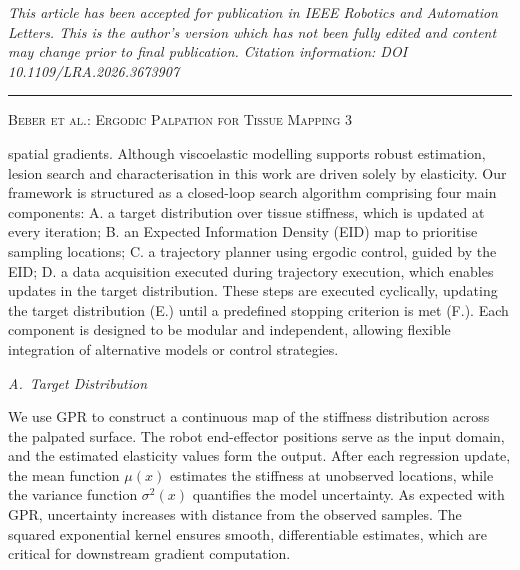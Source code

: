 \documentclass[11pt]{article}
\begin{document}
\begin{center}
{\footnotesize\itshape
This article has been accepted for publication in IEEE Robotics and
Automation Letters. This is the author's version which has not been
fully edited and content may change prior to final publication.
Citation information: DOI 10.1109/LRA.2026.3673907\par}
\end{center}

\vspace{0.4em}
\hrule
\vspace{0.6em}

\noindent
{\footnotesize\scshape Beber et al.: Ergodic Palpation for Tissue Mapping \hfill 3}

\vspace{1.2em}

\noindent
spatial gradients. Although viscoelastic modelling supports robust
estimation, lesion search and characterisation in this work are driven
solely by elasticity. Our framework is structured as a closed-loop
search algorithm comprising four main components: A. a target
distribution over tissue stiffness, which is updated at every
iteration; B. an Expected Information Density (EID) map to prioritise
sampling locations; C. a trajectory planner using ergodic control,
guided by the EID; D. a data acquisition executed during trajectory
execution, which enables updates in the target distribution. These
steps are executed cyclically, updating the target distribution (E.)
until a predefined stopping criterion is met (F.). Each component is
designed to be modular and independent, allowing flexible integration
of alternative models or control strategies.

\vspace{0.6em}

\noindent\textit{A.~Target Distribution}

\vspace{0.2em}

\noindent
We use GPR to construct a continuous map of the stiffness distribution
across the palpated surface. The robot end-effector positions serve as
the input domain, and the estimated elasticity values form the output.
After each regression update, the mean function $\mu(x)$ estimates the
stiffness at unobserved locations, while the variance function
$\sigma^{2}(x)$ quantifies the model uncertainty. As expected with
GPR, uncertainty increases with distance from the observed samples.
The squared exponential kernel ensures smooth, differentiable
estimates, which are critical for downstream gradient computation.
\end{document}
